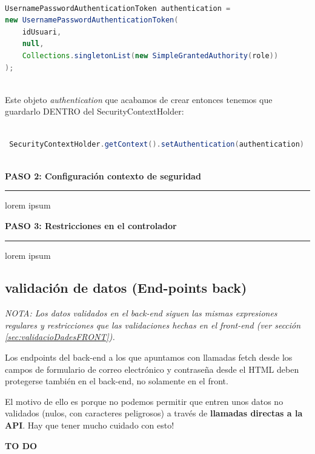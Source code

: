 \documentclass[a4paper,12pt]{report}
\begin{document}
		  
		  
 \begin{lstlisting}[language=Java, basicstyle=\ttfamily\footnotesize, keywordstyle=\color{magenta}]
	  	
UsernamePasswordAuthenticationToken authentication = 
new UsernamePasswordAuthenticationToken(
	idUsuari,
	null,
	Collections.singletonList(new SimpleGrantedAuthority(role))
);



 \end{lstlisting}
Este objeto \textit{authentication} que acabamos de crear entonces tenemos que guardarlo DENTRO del SecurityContextHolder:

		 
 \begin{lstlisting}[language=Java, basicstyle=\ttfamily\footnotesize, keywordstyle=\color{magenta}]

 SecurityContextHolder.getContext().setAuthentication(authentication)
	
\end{lstlisting}
	
	
	


		\noindent \textbf{PASO 2: Configuración contexto de seguridad}
		\hrule
		
		lorem ipsum
		
		\noindent \textbf{PASO 3: Restricciones en el controlador}
		\hrule
		


		
		lorem ipsum
		
		
			\subsection{validación de datos (End-points back)}
			\label{sec:validacioDadesBACK}
			
			\textit{NOTA: Los datos validados en el back-end siguen las mismas expresiones regulares y restricciones que las validaciones hechas en el front-end (ver sección \ref{sec:validacioDadesFRONT}).}
			
			Los endpoints del back-end a los que apuntamos con llamadas fetch desde los campos de formulario de correo electrónico y contraseña desde el HTML deben protegerse también en el back-end, no solamente en el front.
			
			El motivo de ello es porque no podemos permitir que entren unos datos no validados (nulos, con caracteres peligrosos) a través de \textbf{llamadas directas a la API}. Hay que tener mucho cuidado con esto!
			
		\textbf{	TO DO }
			
\end{document}

